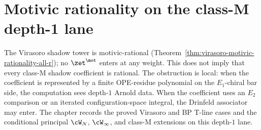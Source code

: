 
\providecommand{\PhiFA}{\Phi^{\mathrm{FA}}}
\providecommand{\SpCh}{\mathrm{Sp}^{\mathrm{ch}}}

\chapter{Motivic rationality on the class-M depth-1 lane}
\label{ch:motivic-class-m-full}

\begin{overture}
The Virasoro shadow tower is motivic-rational
(Theorem~\ref{thm:virasoro-motivic-rationality-all-r}); no
$\zet^{\mot}$ enters at any weight. This does not imply that every
class-M shadow coefficient is rational. The obstruction is local:
when the coefficient is represented by a finite OPE-residue polynomial
on the $E_1$-chiral bar side, the computation sees depth-$1$ Arnold
data. When the coefficient uses an $E_2$ comparison or an iterated
configuration-space integral, the Drinfeld associator may enter. The
chapter records the proved Virasoro and BP T-line cases and the
conditional principal $\cW_N$, $\cW_{\infty}$, and class-M extensions
on this depth-$1$ lane.
\end{overture}

